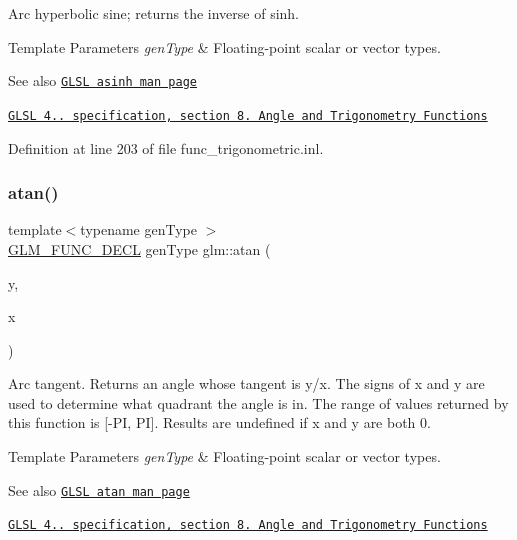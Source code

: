 Arc hyperbolic sine; returns the inverse of sinh.


\begin{DoxyTemplParams}{Template Parameters}
{\em gen\+Type} & Floating-\/point scalar or vector types.\\
\hline
\end{DoxyTemplParams}
\begin{DoxySeeAlso}{See also}
\href{http://www.opengl.org/sdk/docs/manglsl/xhtml/asinh.xml}{\tt G\+L\+SL asinh man page} 

\href{http://www.opengl.org/registry/doc/GLSLangSpec.4.20.8.pdf}{\tt G\+L\+SL 4.. specification, section 8. Angle and Trigonometry Functions} 
\end{DoxySeeAlso}


Definition at line 203 of file func\+\_\+trigonometric.\+inl.

\mbox{\label{group__core__func__trigonometric_gabf80ac0817d1db032dd6a0969aa2b84a}} 
\subsubsection{\texorpdfstring{atan()}{atan()}\hspace{0.1cm}{\footnotesize\ttfamily [1/2]}}
{\footnotesize\ttfamily template$<$typename gen\+Type $>$ \\
\hyperlink{setup_8hpp_ab2d052de21a70539923e9bcbf6e83a51}{G\+L\+M\+\_\+\+F\+U\+N\+C\+\_\+\+D\+E\+CL} gen\+Type glm\+::atan (\begin{DoxyParamCaption}\item[{gen\+Type const \&}]{y,  }\item[{gen\+Type const \&}]{x }\end{DoxyParamCaption})}

Arc tangent. Returns an angle whose tangent is y/x. The signs of x and y are used to determine what quadrant the angle is in. The range of values returned by this function is \mbox{[}-\/\+PI, PI\mbox{]}. Results are undefined if x and y are both 0.


\begin{DoxyTemplParams}{Template Parameters}
{\em gen\+Type} & Floating-\/point scalar or vector types.\\
\hline
\end{DoxyTemplParams}
\begin{DoxySeeAlso}{See also}
\href{http://www.opengl.org/sdk/docs/manglsl/xhtml/atan.xml}{\tt G\+L\+SL atan man page} 

\href{http://www.opengl.org/registry/doc/GLSLangSpec.4.20.8.pdf}{\tt G\+L\+SL 4.. specification, section 8. Angle and Trigonometry Functions} 
\end{DoxySeeAlso}



